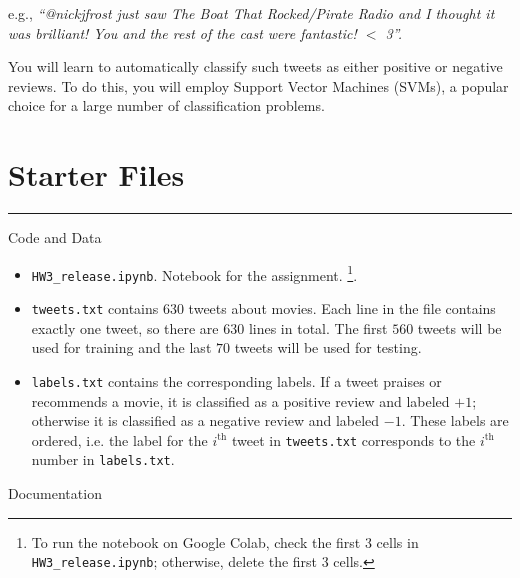 \documentclass[11pt]{article}
\begin{document}
e.g., \textit{``@nickjfrost just saw The Boat That Rocked/Pirate Radio and I thought it was brilliant! You and the rest of the cast were fantastic! $<$ 3''.}

You will learn to automatically classify such tweets as either positive or negative reviews. To do this, you will employ Support Vector Machines (SVMs), a popular choice for a large number of classification problems.

\section*{Starter Files}
\vspace{-\baselineskip}
\rule{\textwidth}{1pt}
Code and Data
\begin{itemize}[nolistsep]
    \item \verb|HW3_release.ipynb|. Notebook for the assignment. \footnote{To run the notebook on Google Colab, check the first 3 cells in \verb|HW3_release.ipynb|; otherwise, delete the first 3 cells.}.
    \item \verb|tweets.txt| contains 630 tweets about movies. Each line in the file contains exactly one tweet, so there are 630 lines in total. The first $560$ tweets will be used for training and the last $70$ tweets will be used for testing.
    \item \verb|labels.txt| contains the corresponding labels. If a tweet praises or recommends a movie, it is classified as a positive review and labeled $+1$; otherwise it is classified as a negative review and labeled $-1$. These labels are ordered, i.e. the label for the $i^\textrm{th}$ tweet in \verb|tweets.txt| corresponds to the $i^\textrm{th}$ number in \verb|labels.txt|.
\end{itemize}
Documentation
\end{document}
